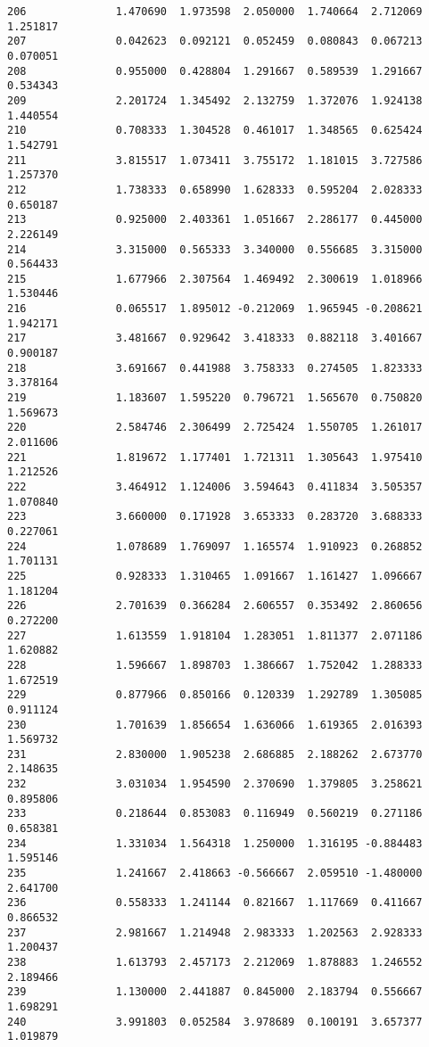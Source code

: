 \documentclass[11pt]{article}
\begin{document}
\begin{Verbatim}[commandchars=\\\{\}]
206              1.470690  1.973598  2.050000  1.740664  2.712069  1.251817
207              0.042623  0.092121  0.052459  0.080843  0.067213  0.070051
208              0.955000  0.428804  1.291667  0.589539  1.291667  0.534343
209              2.201724  1.345492  2.132759  1.372076  1.924138  1.440554
210              0.708333  1.304528  0.461017  1.348565  0.625424  1.542791
211              3.815517  1.073411  3.755172  1.181015  3.727586  1.257370
212              1.738333  0.658990  1.628333  0.595204  2.028333  0.650187
213              0.925000  2.403361  1.051667  2.286177  0.445000  2.226149
214              3.315000  0.565333  3.340000  0.556685  3.315000  0.564433
215              1.677966  2.307564  1.469492  2.300619  1.018966  1.530446
216              0.065517  1.895012 -0.212069  1.965945 -0.208621  1.942171
217              3.481667  0.929642  3.418333  0.882118  3.401667  0.900187
218              3.691667  0.441988  3.758333  0.274505  1.823333  3.378164
219              1.183607  1.595220  0.796721  1.565670  0.750820  1.569673
220              2.584746  2.306499  2.725424  1.550705  1.261017  2.011606
221              1.819672  1.177401  1.721311  1.305643  1.975410  1.212526
222              3.464912  1.124006  3.594643  0.411834  3.505357  1.070840
223              3.660000  0.171928  3.653333  0.283720  3.688333  0.227061
224              1.078689  1.769097  1.165574  1.910923  0.268852  1.701131
225              0.928333  1.310465  1.091667  1.161427  1.096667  1.181204
226              2.701639  0.366284  2.606557  0.353492  2.860656  0.272200
227              1.613559  1.918104  1.283051  1.811377  2.071186  1.620882
228              1.596667  1.898703  1.386667  1.752042  1.288333  1.672519
229              0.877966  0.850166  0.120339  1.292789  1.305085  0.911124
230              1.701639  1.856654  1.636066  1.619365  2.016393  1.569732
231              2.830000  1.905238  2.686885  2.188262  2.673770  2.148635
232              3.031034  1.954590  2.370690  1.379805  3.258621  0.895806
233              0.218644  0.853083  0.116949  0.560219  0.271186  0.658381
234              1.331034  1.564318  1.250000  1.316195 -0.884483  1.595146
235              1.241667  2.418663 -0.566667  2.059510 -1.480000  2.641700
236              0.558333  1.241144  0.821667  1.117669  0.411667  0.866532
237              2.981667  1.214948  2.983333  1.202563  2.928333  1.200437
238              1.613793  2.457173  2.212069  1.878883  1.246552  2.189466
239              1.130000  2.441887  0.845000  2.183794  0.556667  1.698291
240              3.991803  0.052584  3.978689  0.100191  3.657377  1.019879

\end{Verbatim}
\end{document}
